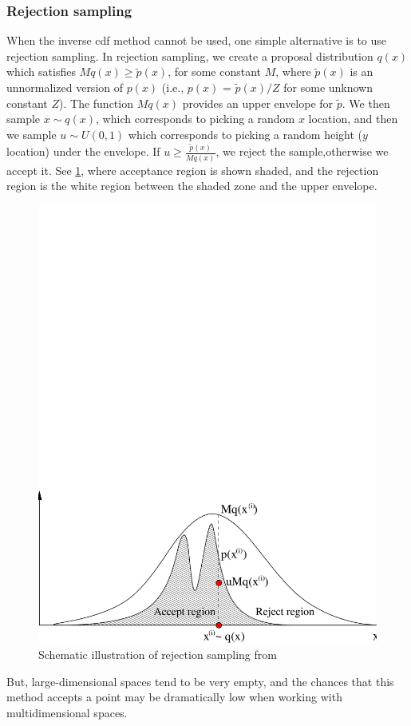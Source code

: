 \subsubsection{Rejection sampling}
When the inverse cdf method cannot be used, one simple alternative is to use rejection sampling. In rejection sampling, we create a proposal distribution $q(x)$ which satisfies $Mq(x) \geq \tilde{p}(x)$, for some constant $M$, where $\tilde{p}(x)$ is an unnormalized version of $p(x)$ (i.e., $p(x)$ = $\tilde{p}(x)/Z$ for some unknown constant $Z$). The function $Mq(x)$ provides an upper envelope for $\tilde{p}$. We then sample $x \sim q(x)$, which corresponds to picking a random $x$ location, and then we sample $u \sim U(0,1)$ which corresponds to picking a random height ($y$ location) under the
envelope. If $u \geq \frac{\tilde{p}(x)}{Mq(x)}$, we reject the sample,otherwise we accept it. See \cref{fig:fig-rejectsampling}, where acceptance region is shown shaded, and the rejection region is the white region between the shaded zone and the upper envelope.
\begin{figure}[H]
    \centering
    \includegraphics[width = 140mm]{Figures/figure-rejectionsampling.pdf}
    \caption{Schematic illustration of rejection sampling from \protect\cite{andrieu2003}}
    \label{fig:fig-rejectsampling}
\end{figure}
But, large-dimensional spaces tend to be very empty, and the chances that this method accepts a point may be dramatically low when working with multidimensional spaces.

